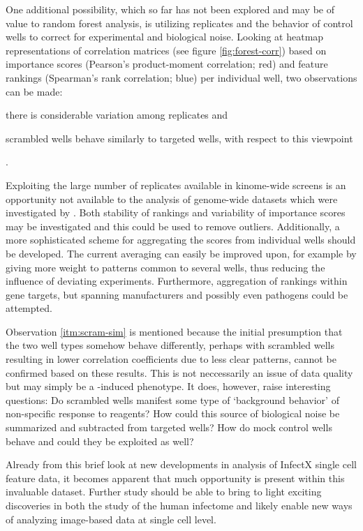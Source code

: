 

One additional possibility, which so far has not been explored and may be of value to random forest analysis, is utilizing replicates and the behavior of control wells to correct for experimental and biological noise. Looking at heatmap representations of correlation matrices (see figure \ref{fig:forest-corr}) based on importance scores (Pearson's product-moment correlation; red) and feature rankings (Spearman's rank correlation; blue) per individual well, two observations can be made: \begin{enumerate*}[label=\itshape (\arabic*)] \item there is considerable variation among replicates and \item \label{itm:scram-sim} scrambled wells behave similarly to targeted  wells, with respect to this viewpoint \end{enumerate*}.

Exploiting the large number of replicates available in kinome-wide screens is an opportunity not available to the analysis of genome-wide datasets which were investigated by \citeauthor{Drewek2015}. Both stability of rankings and variability of importance scores may be investigated and this could be used to remove outliers. Additionally, a more sophisticated scheme for aggregating the scores from individual wells should be developed. The current averaging can easily be improved upon, for example by giving more weight to patterns common to several wells, thus reducing the influence of deviating experiments. Furthermore, aggregation of rankings within gene targets, but spanning manufacturers and possibly even pathogens could be attempted.

Observation \ref{itm:scram-sim} is mentioned because the initial presumption that the two well types somehow behave differently, perhaps with scrambled wells resulting in lower correlation coefficients due to less clear patterns, cannot be confirmed based on these results. This is not neccessarily an issue of data quality but may simply be a -induced phenotype. It does, however, raise interesting questions: Do scrambled wells manifest some type of `background behavior' of non-specific response to  reagents? How could this source of biological noise be summarized and subtracted from targeted  wells? How do mock control wells behave and could they be exploited as well?

Already from this brief look at new developments in analysis of InfectX single cell feature data, it becomes apparent that much opportunity is present within this invaluable dataset. Further study should be able to bring to light exciting discoveries in both the study of the human infectome and likely enable new ways of analyzing image-based  data at single cell level.